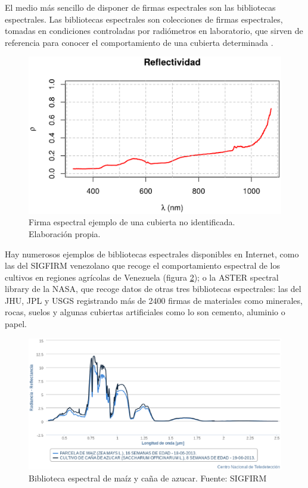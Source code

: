 El medio más sencillo de disponer de firmas espectrales son las bibliotecas espectrales. Las bibliotecas espectrales son colecciones de firmas espectrales, tomadas en condiciones controladas por radiómetros en laboratorio, que sirven de referencia para conocer el comportamiento de una cubierta determinada \citep{andinofase1}.

\begin{figure}
	\centering	
	\includegraphics[width=0.7\linewidth]{./Imagenes/Firma_espectral.eps}
	\caption[Firma espectral ejemplo]{Firma espectral ejemplo de una cubierta no identificada. Elaboración propia.}
	\label{fig:firma}
\end{figure}

Hay numerosos ejemplos de bibliotecas espectrales disponibles en Internet, como las del \ac{SIGFIRM} venezolano que recoge el comportamiento espectral de los cultivos en regiones agrícolas de Venezuela (figura \ref{fig:biblioteca_esp}); o la ASTER spectral library de la NASA, que recoge datos de otras tres bibliotecas espectrales: las del \ac{JHU}, \ac{JPL} y \ac{USGS} registrando más de 2400 firmas de materiales como minerales, rocas, suelos y algunas cubiertas artificiales como lo son cemento, aluminio o papel.%

\begin{figure}
	\centering
	\includegraphics[width=0.7\linewidth]{./Imagenes/biblioteca_espectral_SIGFIRM.eps}
	\caption[Biblioteca espectral SIGFIRM]{Biblioteca espectral de maíz y caña de azucar. Fuente: \ac{SIGFIRM}}
	\label{fig:biblioteca_esp}
\end{figure}

